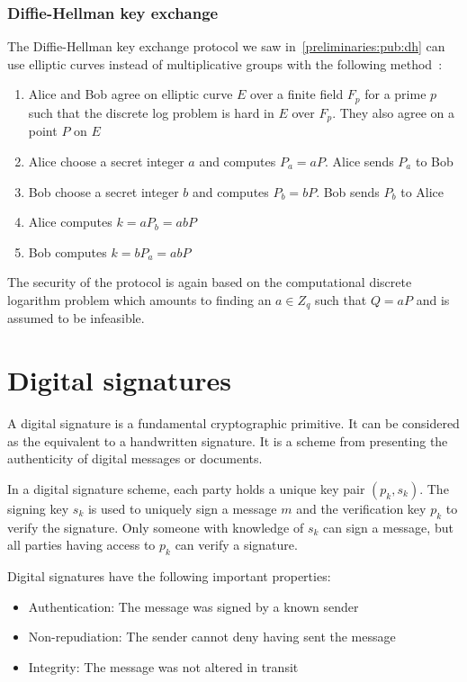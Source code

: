 \subsubsection{Diffie-Hellman key exchange}
\label{preliminaries:pub:el_curves:dh}

The Diffie-Hellman key exchange protocol we saw in~\ref{preliminaries:pub:dh} can use elliptic curves instead of multiplicative groups with the following method~\cite{elliptic_curves}:

\begin{enumerate}
  \item Alice and Bob agree on elliptic curve $E$ over a finite field $F_p$ for a prime $p$ such that the discrete log problem is hard in $E$ over $F_p$. They also agree on a point $P$ on $E$
  \item Alice choose a secret integer $a$ and computes $P_a = aP$. Alice sends $P_a$ to Bob
  \item Bob choose a secret integer $b$ and computes $P_b = bP$. Bob sends $P_b$ to Alice
  \item Alice computes $k = aP_b = abP$
  \item Bob computes $k = bP_a = abP$
\end{enumerate}

The security of the protocol is again based on the computational discrete logarithm problem which amounts to finding an $a \in Z_q$ such that $Q = aP$ and is assumed to be infeasible.

\section{Digital signatures}
\label{preliminaries:sign}

A digital signature is a fundamental cryptographic primitive. It can be considered as the equivalent to a handwritten signature. It is a scheme from presenting the authenticity of digital messages or documents.

In a digital signature scheme, each party holds a unique key pair $(p_k, s_k)$. The signing key $s_k$ is used to uniquely sign a message $m$ and the verification key $p_k$ to verify the signature. Only someone with knowledge of $s_k$ can sign a message, but all parties having access to $p_k$ can verify a signature.

Digital signatures have the following important properties:

\begin{itemize}
  \item Authentication: The message was signed by a known sender
  \item Non-repudiation: The sender cannot deny having sent the message
  \item Integrity: The message was not altered in transit
\end{itemize}

